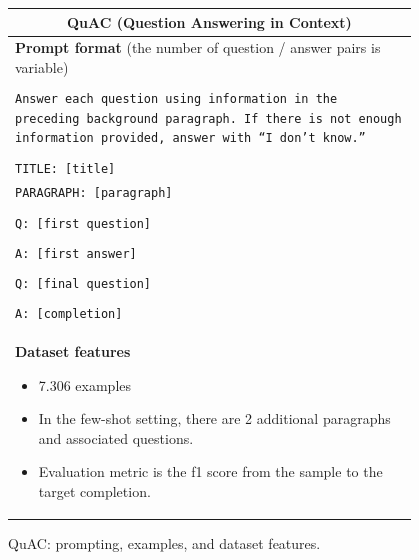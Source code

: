 \documentclass{article}
\begin{document}
\begin{figure}[p]
    \centering
    \small
    \begin{tabular}{p{0.95\linewidth}}
    \toprule
    \multicolumn{1}{c}{\textbf{QuAC (Question Answering in Context)}} \\
    \midrule
    \textbf{Prompt format} {(the number of question / answer pairs is variable)}\\\\
    \texttt{Answer each question using information in the preceding background paragraph. If there is not enough information provided, answer with ``I don't know.''}\\\\
    \texttt{TITLE: [title]} \\
    \texttt{PARAGRAPH: [paragraph]} \\\\
    \texttt{Q: [first question]} \\\\
    \texttt{A: [first answer]} \\\\
    \texttt{Q: [final question]} \\\\
    \texttt{A: [completion]} \\

    \midrule
    \textbf{Dataset features}
    \begin{itemize}
        \item 7.306 examples
        \item In the few-shot setting, there are 2 additional paragraphs and associated questions.
        \item Evaluation metric is the f1 score from the sample to the target completion.
    \end{itemize} \\

    \bottomrule
    \end{tabular}
    \caption{QuAC: prompting, examples, and dataset features.}
    \label{tab:prompt-quac}
\end{figure}
\end{document}
